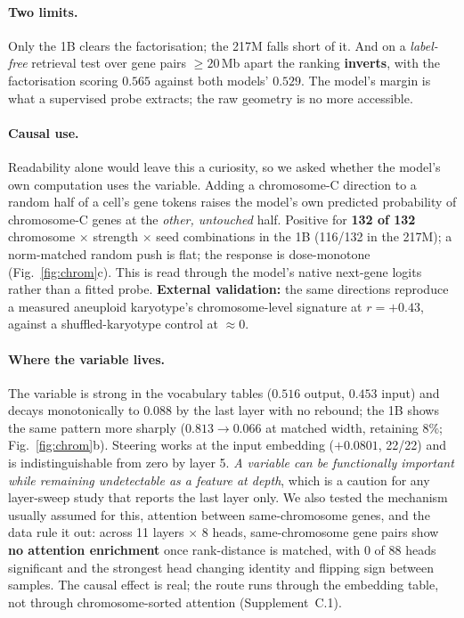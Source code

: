 \documentclass[11pt]{article}
\begin{document}
\paragraph{Two limits.} Only the 1B clears the factorisation; the 217M falls short of
it. And on a \emph{label-free} retrieval test over gene pairs ${\ge}20$\,Mb apart the ranking
\textbf{inverts}, with the factorisation scoring $0.565$ against both models' $0.529$. The model's
margin is what a supervised probe extracts; the raw geometry is no more accessible.

\paragraph{Causal use.} Readability alone would leave this a curiosity, so we asked whether the model's
own computation uses the variable. Adding a chromosome-C direction to a random half of a cell's gene
tokens raises the model's own predicted probability of chromosome-C genes at the \emph{other,
untouched} half. Positive for \textbf{132 of 132} chromosome $\times$ strength $\times$ seed
combinations in the 1B (116/132 in the 217M); a norm-matched random push is flat; the response is
dose-monotone (Fig.~\ref{fig:chrom}c). This is read through the model's native next-gene logits rather
than a fitted probe. \textbf{External validation:} the same directions reproduce a measured aneuploid
karyotype's chromosome-level signature at $r=+0.43$, against a shuffled-karyotype control at
${\approx}0$.

\paragraph{Where the variable lives.} The variable is strong in the vocabulary tables ($0.516$ output,
$0.453$ input) and decays monotonically to $0.088$ by the last layer with no rebound; the 1B shows the
same pattern more sharply ($0.813 \to 0.066$ at matched width, retaining 8\%; Fig.~\ref{fig:chrom}b).
Steering works at the input embedding ($+0.0801$, 22/22) and is indistinguishable from zero by layer 5.
\emph{A variable can be functionally important while remaining undetectable as a feature at depth},
which is a caution for any layer-sweep study that reports the last layer only. We also tested the
mechanism usually assumed for this, attention between same-chromosome genes, and the data rule it out:
across 11 layers $\times$ 8 heads, same-chromosome gene pairs show \textbf{no attention enrichment}
once rank-distance is matched, with 0 of 88 heads significant and the strongest head changing identity
and flipping sign between samples. The causal effect is real; the route runs through the embedding
table, not through chromosome-sorted attention (Supplement~C.1).
\end{document}
